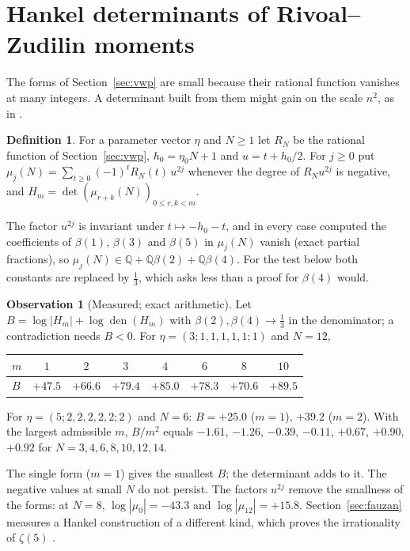 \documentclass[11pt]{article}
\theoremstyle{definition}
\newtheorem{definition}[theorem]{Definition}
\newtheorem{observation}[theorem]{Observation}
\begin{document}
\section{Hankel determinants of Rivoal--Zudilin moments}\label{sec:hankel}

The forms of Section~\ref{sec:vwp} are small because their rational function vanishes at many integers. A determinant built from them might gain on the scale $n^2$, as in \cite{OAI}.

\begin{definition}\label{def:rzhankel}
For a parameter vector $\eta$ and $N\ge1$ let $R_N$ be the rational function of Section~\ref{sec:vwp}, $h_0=\eta_0N+1$ and $u=t+h_0/2$. For $j\ge0$ put $\mu_j(N)=\sum_{t\ge0}(-1)^tR_N(t)\,u^{2j}$ whenever the degree of $R_Nu^{2j}$ is negative, and $H_m=\det(\mu_{r+k}(N))_{0\le r,k<m}$.
\end{definition}

The factor $u^{2j}$ is invariant under $t\mapsto-h_0-t$, and in every case computed the coefficients of $\beta(1)$, $\beta(3)$ and $\beta(5)$ in $\mu_j(N)$ vanish (exact partial fractions), so $\mu_j(N)\in\mathbb Q+\mathbb Q\beta(2)+\mathbb Q\beta(4)$. For the test below both constants are replaced by $\frac13$, which asks less than a proof for $\beta(4)$ would.

\begin{observation}[Measured; exact arithmetic]\label{obs:rzhankel}
Let $B=\log|H_m|+\log\operatorname{den}(H_m)$ with $\beta(2),\beta(4)\to\frac13$ in the denominator; a contradiction needs $B<0$. For $\eta=(3;1,1,1,1,1;1)$ and $N=12$,
\begin{center}
\small
\begin{tabular}{lccccccc}
\toprule
$m$ & $1$ & $2$ & $3$ & $4$ & $6$ & $8$ & $10$\\
\midrule
$B$ & $+47.5$ & $+66.6$ & $+79.4$ & $+85.0$ & $+78.3$ & $+70.6$ & $+89.5$\\
\bottomrule
\end{tabular}
\end{center}
For $\eta=(5;2,2,2,2,2;2)$ and $N=6$: $B=+25.0$ ($m=1$), $+39.2$ ($m=2$). With the largest admissible $m$, $B/m^2$ equals $-1.61$, $-1.26$, $-0.39$, $-0.11$, $+0.67$, $+0.90$, $+0.92$ for $N=3,4,6,8,10,12,14$.
\end{observation}

The single form ($m=1$) gives the smallest $B$; the determinant adds to it. The negative values at small $N$ do not persist. The factors $u^{2j}$ remove the smallness of the forms: at $N=8$, $\log|\mu_0|=-43.3$ and $\log|\mu_{12}|=+15.8$. Section~\ref{sec:fauzan} measures a Hankel construction of a different kind, which proves the irrationality of $\zeta(5)$ \cite{Fauzan}.
\end{document}
